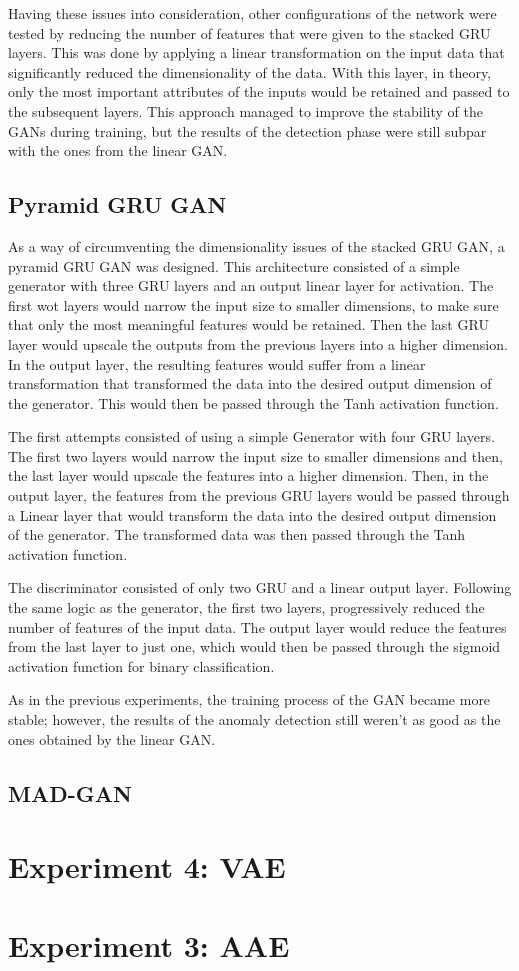 Having these issues into consideration, other configurations of the network were tested by reducing the number of features that were given to the stacked GRU layers. This was done by applying a linear transformation on the input data that significantly reduced the dimensionality of the data. With this layer, in theory, only the most important attributes of the inputs would be retained and passed to the subsequent layers. This approach managed to improve the stability of the GANs during training, but the results of the detection phase were still subpar with the ones from the linear GAN.

\subsection{Pyramid GRU GAN}\label{sec:pyramid_gru_gan}

As a way of circumventing the dimensionality issues of the stacked GRU GAN, a pyramid GRU GAN was designed. This architecture consisted of a simple generator with three GRU layers and an output linear layer for activation.
The first wot layers would narrow the input size to smaller dimensions, to make sure that only the most meaningful features would be retained. Then the last GRU layer would upscale the outputs from the previous layers into a higher dimension. In the output layer, the resulting features would suffer from a linear transformation that transformed the data into the desired output dimension of the generator. This would then be passed through the Tanh activation function.

The first attempts consisted of using a simple Generator with four GRU layers. The first two layers would narrow the input size to smaller dimensions and then, the last layer would upscale the features into a higher dimension. Then, in the output layer, the features from the previous GRU layers would be passed through a Linear layer that would transform the data into the desired output dimension of the generator. The transformed data was then passed through the Tanh activation function. 

The discriminator consisted of only two GRU and a linear output layer. Following the same logic as the generator, the first two layers, progressively reduced the number of features of the input data. The output layer would reduce the features from the last layer to just one, which would then be passed through the sigmoid activation function for binary classification.

As in the previous experiments, the training process of the GAN became more stable; however, the results of the anomaly detection still weren't as good as the ones obtained by the linear GAN.

\subsection{MAD-GAN}\label{sec:mad-gan}





\section{Experiment 4: VAE}\label{sec:mad-gan}
\section{Experiment 3: AAE}\label{sec:gan_experiment_3}

